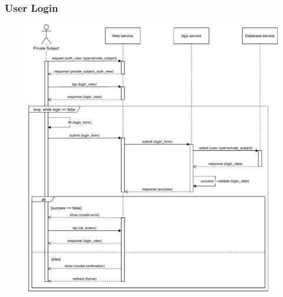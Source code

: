 \documentclass[12pt,a4paper]{article}
\begin{document}
\subsubsection{User Login}
\begin{figure}[H]
				\centering
				\includegraphics[width=1\textwidth,height=0.9\textheight,keepaspectratio]{../assets/sequence_diagrams/exports/login_private_subject.pdf}
				\label{fig:loginUser_sequence}
			\end{figure}
\end{document}
